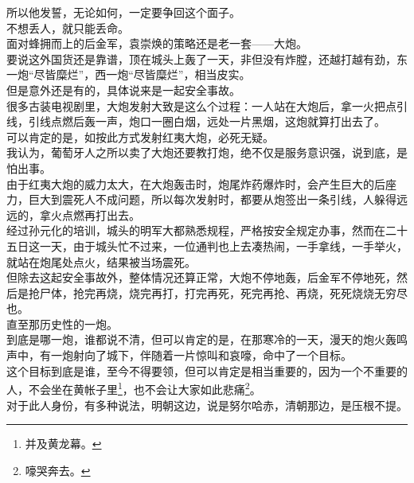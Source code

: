 \begin{multicols}{\theparacolNo}
所以他发誓，无论如何，一定要争回这个面子。\\

不想丢人，就只能丢命。\\

面对蜂拥而上的后金军，袁崇焕的策略还是老一套——大炮。\\

要说这外国货还是靠谱，顶在城头上轰了一天，非但没有炸膛，还越打越有劲，东一炮“尽皆糜烂”，西一炮“尽皆糜烂”，相当皮实。\\

但是意外还是有的，具体说来是一起安全事故。\\

很多古装电视剧里，大炮发射大致是这么个过程：一人站在大炮后，拿一火把点引线，引线点燃后轰一声，炮口一圈白烟，远处一片黑烟，这炮就算打出去了。\\

可以肯定的是，如按此方式发射红夷大炮，必死无疑。\\

我认为，葡萄牙人之所以卖了大炮还要教打炮，绝不仅是服务意识强，说到底，是怕出事。\\

由于红夷大炮的威力太大，在大炮轰击时，炮尾炸药爆炸时，会产生巨大的后座力，巨大到震死人不成问题，所以每次发射时，都要从炮签出一条引线，人躲得远远的，拿火点燃再打出去。\\

经过孙元化的培训，城头的明军大都熟悉规程，严格按安全规定办事，然而在二十五日这一天，由于城头忙不过来，一位通判也上去凑热闹，一手拿线，一手举火，就站在炮尾处点火，结果被当场震死。\\

但除去这起安全事故外，整体情况还算正常，大炮不停地轰，后金军不停地死，然后是抢尸体，抢完再烧，烧完再打，打完再死，死完再抢、再烧，死死烧烧无穷尽也。\\

直至那历史性的一炮。\\

到底是哪一炮，谁都说不清，但可以肯定的是，在那寒冷的一天，漫天的炮火轰鸣声中，有一炮射向了城下，伴随着一片惊叫和哀嚎，命中了一个目标。\\

这个目标到底是谁，至今不得要领，但可以肯定是相当重要的，因为一个不重要的人，不会坐在黄帐子里\footnote{并及黄龙幕。}，也不会让大家如此悲痛\footnote{嚎哭奔去。}。\\

对于此人身份，有多种说法，明朝这边，说是努尔哈赤，清朝那边，是压根不提。\\


\end{multicols}
